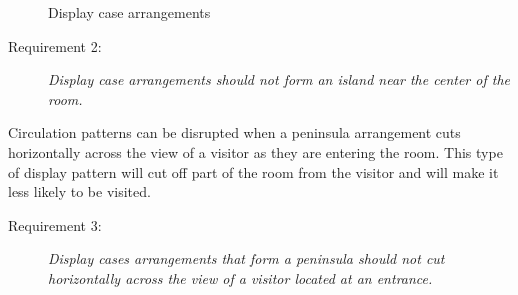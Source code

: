 \documentclass[12pt]{ucthesis}
\begin{document}
   \begin{figure}[H]
 \centering
 \hspace{10 mm}
  \hspace{10 mm}
 \caption{Display case arrangements}
\label{display-arrangement}
\end{figure}
 
\begin{description}
\item[Requirement 2:] \emph{Display case arrangements should not form an island near the center of the room.}
\end{description} 

Circulation patterns can be disrupted when a peninsula arrangement cuts horizontally across the view of a visitor as they are entering the room. This type of display pattern will cut off part of the room from the visitor and will make it less likely to be visited.

\begin{description}
\item[Requirement 3:] \emph{Display cases arrangements that form a peninsula should not cut horizontally across the view of a visitor located at an entrance.}
\end{description} 
\end{document}
